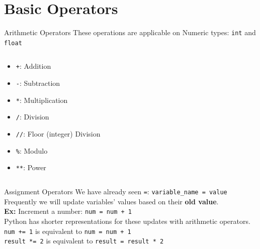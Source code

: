     
     \section{Basic Operators} 
        \begin{frame}{Arithmetic Operators}
            \LARGE
            These operations are applicable on Numeric types: \texttt{int} and \texttt{float}
            \pause
            \begin{columns}
               \begin{column}{0.40\textwidth}
                \vspace{-5mm}
                \begin{itemize}
                    \item \texttt{+}: Addition
                    \pause
                    \item \texttt{-}: Subtraction
                    \pause
                    \item \texttt{*}: Multiplication
                    \pause
                    \item \texttt{/}: Division
                    \pause
                    \item \texttt{//}: Floor (integer) Division
                    \pause
                    \item \texttt{\%}: Modulo
                    \pause
                    \item \texttt{**}: Power 
                \end{itemize}
               \end{column}
               \pause
               \begin{column}{0.65\textwidth}
                \inputminted[frame=single,framesep=2pt]{python3}{code-examples/numeric_operators.py}
               \end{column} 
            \end{columns}
        \end{frame}
        
        \begin{frame}{Assignment Operators}
            \LARGE
            We have already seen \texttt{\textquotesingle=\textquotesingle}: 
            \texttt{variable\_name = value}\\
            \pause
            \medskip
            Frequently we will update variables' values based on their \textbf{old value}.\\
            \textbf{Ex:} Increment a number: \texttt{num = num + 1}\\
            \pause
            \medskip
            Python has shorter representations for these updates with arithmetic operators.\\
            \pause
            \texttt{num += 1} is equivalent to \texttt{num = num + 1}\\
            \pause
            \texttt{result *= 2} is equivalent to \texttt{result = result * 2}\\
        \end{frame}

